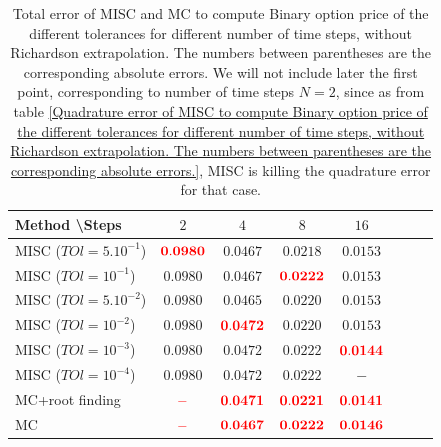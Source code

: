 \documentclass[11pt]{article}
\begin{document}
\begin{table}[h!]
	\centering
	\begin{tabular}{l*{6}{c}r}
		Method \textbackslash  Steps            & $2$ & $4$ & $8$ & $16$  \\
		\hline
		MISC ($TOl=5.10^{-1}$)  & $\mathbf{{\color{red}0.0980}}$ & $\mathbf{0.0467}$ & $\mathbf{ 0.0218}$ & $\mathbf{0.0153}$  \\
		MISC ($TOl=10^{-1}$)  &$\mathbf{0.0980}$& $\mathbf{0.0467}$ & $\mathbf{{\color{red}0.0222}}$ & $\mathbf{0.0153}$   \\
		MISC ($TOl=5.10^{-2}$) & $\mathbf{0.0980}$ & $\mathbf{0.0465}$ & $\mathbf{0.0220}$ & $\mathbf{0.0153}$  \\
		MISC ($TOl=10^{-2}$)  & $\mathbf{0.0980}$ & $\mathbf{{\color{red} 0.0472}}$ & $\mathbf{ 0.0220}$ & $\mathbf{0.0153}$    \\
		MISC ($TOl=10^{-3}$)  & $\mathbf{0.0980}$  & $\mathbf{ 0.0472}$  & $\mathbf{ 0.0222}$  & $\mathbf{{\color{red}0.0144}}$\\
	MISC ($TOl=10^{-4}$)  & $\mathbf{0.0980}$ & $\mathbf{0.0472}$ & $\mathbf{ 0.0222}$ & $\mathbf{-}$  \\
		\hline
		MC+root finding   &  $\mathbf{{\color{red}-}}$ & $\mathbf{{\color{red}0.0471 }}$ & $\mathbf{{\color{red}0.0221}}$ & $\mathbf{{\color{red}0.0141}}$  \\	
			MC     &  $\mathbf{{\color{red}-}}$ & $\mathbf{{\color{red}0.0467}}$ & $\mathbf{{\color{red}0.0222}}$ & $\mathbf{{\color{red}0.0146}}$  \\	
		\hline
	
	\end{tabular}
	\caption{Total error of MISC and MC to compute Binary option price of the different tolerances for different number of time steps, without Richardson extrapolation. The numbers between parentheses are the corresponding absolute errors. We will not include later the first point, corresponding to number of time steps $N=2$, since as from table \ref{Quadrature error of MISC to compute Binary option price of the different tolerances for different number of time steps, without Richardson extrapolation. The numbers between parentheses are the corresponding absolute errors.}, MISC is killing the quadrature error for that case.}
	\label{Total error of MISC and MC to compute Binary option price of the different tolerances for different number of time steps, without Richardson extrapolation. The numbers between parentheses are the corresponding absolute errors.}
\end{table}
\end{document}
